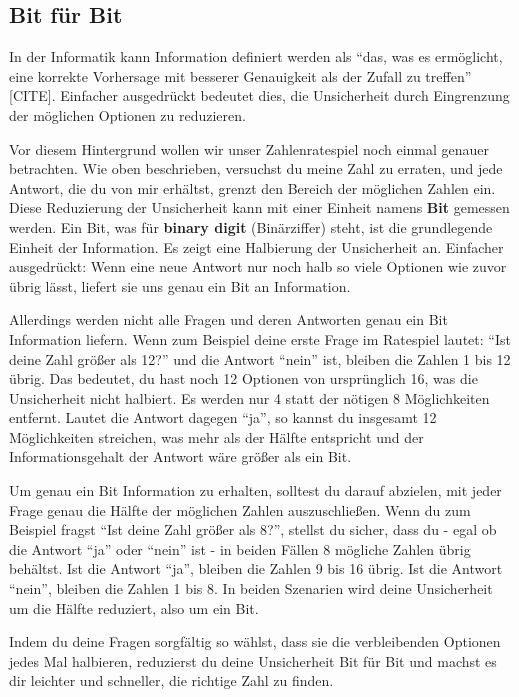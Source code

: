 \documentclass[
  letterpaper,
  DIV=11]{scrreprt}
\begin{document}
\subsection{Bit für Bit}\label{bit-fuxfcr-bit}

In der Informatik kann Information definiert werden als ``das, was es
ermöglicht, eine korrekte Vorhersage mit besserer Genauigkeit als der
Zufall zu treffen'' {[}CITE{]}. Einfacher ausgedrückt bedeutet dies, die
Unsicherheit durch Eingrenzung der möglichen Optionen zu reduzieren.

Vor diesem Hintergrund wollen wir unser Zahlenratespiel noch einmal
genauer betrachten. Wie oben beschrieben, versuchst du meine Zahl zu
erraten, und jede Antwort, die du von mir erhältst, grenzt den Bereich
der möglichen Zahlen ein. Diese Reduzierung der Unsicherheit kann mit
einer Einheit namens \textbf{Bit} gemessen werden. Ein Bit, was für
\textbf{binary digit} (Binärziffer) steht, ist die grundlegende Einheit
der Information. Es zeigt eine Halbierung der Unsicherheit an. Einfacher
ausgedrückt: Wenn eine neue Antwort nur noch halb so viele Optionen wie
zuvor übrig lässt, liefert sie uns genau ein Bit an Information.

Allerdings werden nicht alle Fragen und deren Antworten genau ein Bit
Information liefern. Wenn zum Beispiel deine erste Frage im Ratespiel
lautet: ``Ist deine Zahl größer als 12?'' und die Antwort ``nein'' ist,
bleiben die Zahlen 1 bis 12 übrig. Das bedeutet, du hast noch 12
Optionen von ursprünglich 16, was die Unsicherheit nicht halbiert. Es
werden nur 4 statt der nötigen 8 Möglichkeiten entfernt. Lautet die
Antwort dagegen ``ja'', so kannst du insgesamt 12 Möglichkeiten
streichen, was mehr als der Hälfte entspricht und der Informationsgehalt
der Antwort wäre größer als ein Bit.

Um genau ein Bit Information zu erhalten, solltest du darauf abzielen,
mit jeder Frage genau die Hälfte der möglichen Zahlen auszuschließen.
Wenn du zum Beispiel fragst ``Ist deine Zahl größer als 8?'', stellst du
sicher, dass du - egal ob die Antwort ``ja'' oder ``nein'' ist - in
beiden Fällen 8 mögliche Zahlen übrig behältst. Ist die Antwort ``ja'',
bleiben die Zahlen 9 bis 16 übrig. Ist die Antwort ``nein'', bleiben die
Zahlen 1 bis 8. In beiden Szenarien wird deine Unsicherheit um die
Hälfte reduziert, also um ein Bit.

Indem du deine Fragen sorgfältig so wählst, dass sie die verbleibenden
Optionen jedes Mal halbieren, reduzierst du deine Unsicherheit Bit für
Bit und machst es dir leichter und schneller, die richtige Zahl zu
finden.
\end{document}
